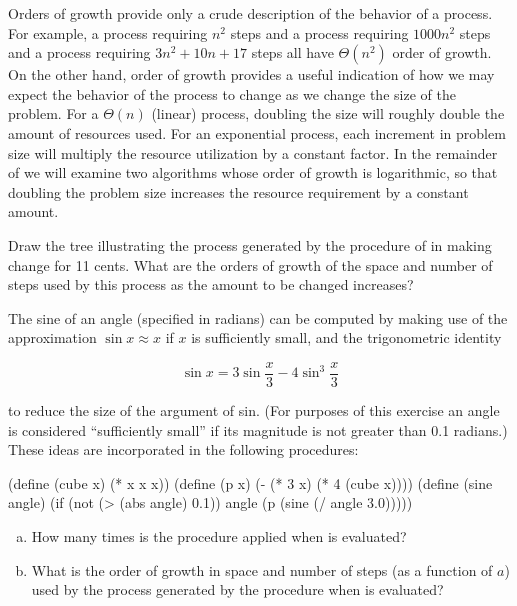 Orders of growth provide only a crude description of the behavior of a process.
For example, a process requiring \( n^2 \) steps and a process requiring
\( 1000n^2 \) steps and a process requiring \( 3n^2 + 10n + 17 \) steps all
have \( \Theta(n^2) \) order of growth.  On the other hand, order of growth
provides a useful indication of how we may expect the behavior of the process
to change as we change the size of the problem.  For a \( \Theta(n) \)
(linear) process, doubling the size will roughly double the amount of resources
used.  For an exponential process, each increment in problem size will multiply
the resource utilization by a constant factor.  In the remainder of
 we will examine two algorithms whose order of growth is logarithmic,
so that doubling the problem size increases the resource requirement by a
constant amount.

\begin{exerciseGroup}
\label{Exercise 1.14}
 Draw the tree illustrating the
process generated by the  procedure of 
in making change for 11 cents.  What are the orders of growth of the space and
number of steps used by this process as the amount to be changed increases?

\label{Exercise 1.15}
 The sine of an angle (specified
in radians) can be computed by making use of the approximation
\mbox{\( \sin x \approx x \)} if \( x \) is sufficiently small, and the trigonometric
identity

$$\sin x = 3\sin \frac{x}{3} - 4\sin^3 \frac{x}{3} $$

\noindent
to reduce the size of the argument of sin.  (For purposes of this
exercise an angle is considered ``sufficiently small'' if its magnitude is not
greater than 0.1 radians.) These ideas are incorporated in the following
procedures:

\begin{codeBlock}
(define (cube x) (* x x x))
(define (p x) (- (* 3 x) (* 4 (cube x))))
(define (sine angle)
   (if (not (> (abs angle) 0.1))
       angle
       (p (sine (/ angle 3.0)))))
\end{codeBlock}

\begin{enumerate}[a.]

\item
How many times is the procedure  applied when  is
evaluated?

\item
What is the order of growth in space and number of steps (as a function of
\( a \)) used by the process generated by the  procedure when
 is evaluated?

\end{enumerate}
\end{exerciseGroup}


